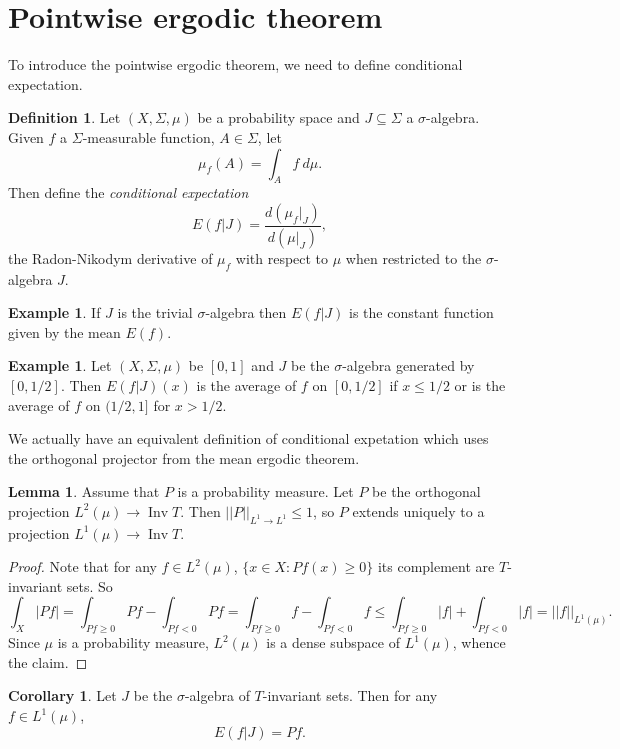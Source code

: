 \documentclass[12pt]{report}
\DeclareMathOperator*{\Inv}{Inv}
\newcommand{\dfn}[1]{\emph{#1}\index{#1}}
\theoremstyle{definition}
\newtheorem{lemma}[theorem]{Lemma}
\newtheorem{corollary}[theorem]{Corollary}
\newtheorem{definition}[theorem]{Definition}
\newtheorem{example}[theorem]{Example}
\begin{document}
\section{Pointwise ergodic theorem}
To introduce the pointwise ergodic theorem, we need to define conditional expectation.
\begin{definition}
Let $(X, \Sigma, \mu)$ be a probability space and $J \subseteq \Sigma$ a $\sigma$-algebra. Given $f$ a $\Sigma$-measurable function, $A \in \Sigma$, let
$$\mu_f(A) = \int_A f~d\mu.$$
Then define the \dfn{conditional expectation}
$$E(f|J) = \frac{d(\mu_f|_J)}{d(\mu|_J)},$$
the Radon-Nikodym derivative of $\mu_f$ with respect to $\mu$ when restricted to the $\sigma$-algebra $J$.
\end{definition}
\begin{example}
If $J$ is the trivial $\sigma$-algebra then $E(f|J)$ is the constant function given by the mean $E(f)$.
\end{example}
\begin{example}
Let $(X, \Sigma, \mu)$ be $[0, 1]$ and $J$ be the $\sigma$-algebra generated by $[0, 1/2]$. Then $E(f|J)(x)$ is the average of $f$ on $[0, 1/2]$ if $x \leq 1/2$ or is the average of $f$ on $(1/2, 1]$ for $x > 1/2$.
\end{example}
We actually have an equivalent definition of conditional expetation which uses the orthogonal projector from the mean ergodic theorem.
\begin{lemma}
Assume that $P$ is a probability measure. Let $P$ be the orthogonal projection $L^2(\mu) \to \Inv T$. Then $||P||_{L^1 \to L^1} \leq 1$, so $P$ extends uniquely to a projection $L^1(\mu) \to \Inv T$.
\end{lemma}
\begin{proof}
Note that for any $f \in L^2(\mu)$, $\{x \in X: Pf(x) \geq 0\}$ its complement are $T$-invariant sets. So
$$\int_X |Pf| = \int_{Pf \geq 0} Pf - \int_{Pf < 0} Pf = \int_{Pf \geq 0} f - \int_{Pf < 0} f \leq \int_{Pf \geq 0} |f| + \int_{Pf < 0} |f| = ||f||_{L^1(\mu)}.$$
Since $\mu$ is a probability measure, $L^2(\mu)$ is a dense subspace of $L^1(\mu)$, whence the claim.
\end{proof}
\begin{corollary}
Let $J$ be the $\sigma$-algebra of $T$-invariant sets. Then for any $f \in L^1(\mu)$,
$$E(f|J) = Pf.$$
\end{corollary}
\end{document}
